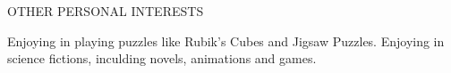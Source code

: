 \begin{rubric}{OTHER PERSONAL INTERESTS}


\entry* Enjoying in playing puzzles like Rubik's Cubes and Jigsaw Puzzles.
\entry* Enjoying in science fictions, inculding novels, animations and games.
\end{rubric}